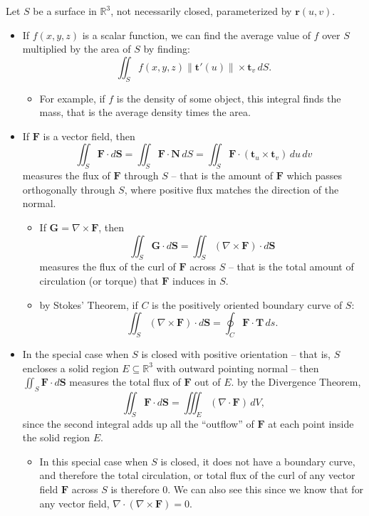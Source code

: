 \documentclass[10pt]{article}
\newcommand{\mb}[1]{\mathbf{#1}}
\newcommand{\vecfuc}[2]{\mb{#1}(#2)}
\newcommand{\normdvecfuc}[2]{\| \mb{#1}'(#2) \|}
\newcommand{\R}{\mathbb{R}}
\begin{document}
Let \(S\) be a surface in \(\R^{3}\), not necessarily closed, parameterized by \(\vecfuc{r}{u,v}\).
\begin{itemize}
    \item If \(f(x,y,z)\) is a scalar function, we can find the average value of \(f\) over \(S\) multiplied by the area of \(S\) by finding:
    \[
        \iint_{S} f(x,y,z) \normdvecfuc{t}{u} \times \mb{t}_{v} \, dS.
    \]
    \begin{itemize}
        \item For example, if \(f\) is the density of some object, this integral finds the mass, that is the average density times the area.
    \end{itemize}
    \item If \(\mb{F}\) is a vector field, then
    \[
        \iint_{S} \mb{F} \cdot d\mb{S} = \iint_{S} \mb{F} \cdot \mb{N} \, dS = \iint_{S} \mb{F} \cdot (\mb{t}_{u} \times \mb{t}_{v}) \, du \, dv
    \]
    measures the flux of \(\mb{F}\) through \(S\) – that is the amount of \(\mb{F}\) which passes orthogonally through \(S\), where positive flux matches the direction of the normal.
    \begin{itemize}
        \item If \(\mb{G} = \nabla \times \mb{F}\), then 
        \[
            \iint_{S} \mb{G} \cdot d\mb{S} = \iint_{S} (\nabla \times \mb{F}) \cdot d\mb{S}
        \]
        measures the flux of the curl of \(\mb{F}\) across \(S\) – that is the total amount of circulation (or torque) that \(\mb{F}\) induces in \(S\).
        \item by Stokes’ Theorem, if \(C\) is the positively oriented boundary curve of \(S\):
        \[
            \iint_{S} (\nabla \times \mb{F}) \cdot d\mb{S} = \oint_{C} \mb{F} \cdot \mb{T} \, ds.
        \]
    \end{itemize}
    \item In the special case when \(S\) is closed with positive orientation – that is, \(S\) encloses a solid region \(E \subseteq \R^{3}\) with outward pointing normal – then \(\displaystyle \iint_{S} \mb{F} \cdot d\mb{S}\) measures the total flux of \(\mb{F}\) out of \(E\). by the Divergence Theorem,
    \[
        \iint_{S} \mb{F} \cdot d\mb{S} = \iiint_{E} (\nabla \cdot \mb{F}) \, dV,
    \]
    since the second integral adds up all the ``outflow'' of \(\mb{F}\) at each point inside the solid region \(E\).
    \begin{itemize}
        \item In this special case when \(S\) is closed, it does not have a boundary curve, and therefore the total circulation, or total flux of the curl of any vector field \(\mb{F}\) across \(S\) is therefore 0. We can also see this since we know that for any vector field, \(\nabla \cdot (\nabla \times \mb{F}) = 0\).
    \end{itemize}
\end{itemize}
\end{document}
